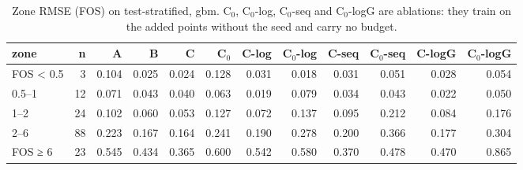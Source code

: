 \begin{table}[htbp]
\centering
\small
\setlength{\tabcolsep}{4pt}
\caption{Zone RMSE (FOS) on test-stratified, gbm. C$_0$, C$_0$-log, C$_0$-seq and C$_0$-logG are ablations: they train on the added points without the seed and carry no budget.}
\label{tab:test-stratified__fos-rmse:zones:gbm}
\begin{tabular}{lrrrrrrrrrrr}
\toprule
zone & n & A & B & C & C$_0$ & C-log & C$_0$-log & C-seq & C$_0$-seq & C-logG & C$_0$-logG \\
\midrule
FOS < 0.5 & 3 & 0.104 & 0.025 & 0.024 & 0.128 & 0.031 & 0.018 & 0.031 & 0.051 & 0.028 & 0.054 \\
0.5–1 & 12 & 0.071 & 0.043 & 0.040 & 0.063 & 0.019 & 0.079 & 0.034 & 0.043 & 0.022 & 0.050 \\
1–2 & 24 & 0.102 & 0.060 & 0.053 & 0.127 & 0.072 & 0.137 & 0.095 & 0.212 & 0.084 & 0.176 \\
2–6 & 88 & 0.223 & 0.167 & 0.164 & 0.241 & 0.190 & 0.278 & 0.200 & 0.366 & 0.177 & 0.304 \\
FOS ≥ 6 & 23 & 0.545 & 0.434 & 0.365 & 0.600 & 0.542 & 0.580 & 0.370 & 0.478 & 0.470 & 0.865 \\
\bottomrule
\end{tabular}
\end{table}
